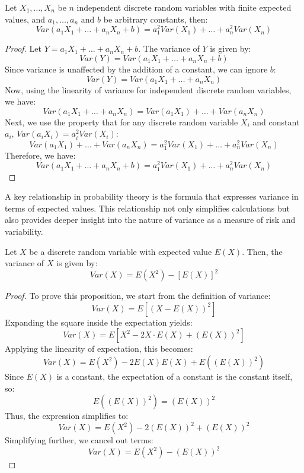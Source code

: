 \begin{proposition}
Let \(X_{1}, \ldots, X_{n}\) be $n$ independent discrete random variables with finite expected values, and \(a_{1},\ldots,a_{n}\) and \(b\) be arbitrary constants, then:
\[
Var\left(a_{1}X_{1}+\ldots+a_{n}X_{n}+b\right)=a_{1}^{2}Var\left(X_{1}\right)+\ldots+a_{n}^{2}Var\left(X_{n}\right)
\]
\end{proposition}
\begin{proof}
Let \(Y = a_{1}X_{1} + \ldots + a_{n}X_{n} + b\). The variance of \(Y\) is given by:
\[
Var(Y) = Var(a_{1}X_{1} + \ldots + a_{n}X_{n} + b)
\]
Since variance is unaffected by the addition of a constant, we can ignore \(b\):
\[
Var(Y) = Var(a_{1}X_{1} + \ldots + a_{n}X_{n})
\]
Now, using the linearity of variance for independent discrete random variables, we have:
\[
Var(a_{1}X_{1} + \ldots + a_{n}X_{n}) = Var(a_{1}X_{1}) + \ldots + Var(a_{n}X_{n})
\]
Next, we use the property that for any discrete random variable \(X_i\) and constant \(a_i\), \(Var(a_i X_i) = a_i^2 Var(X_i)\):
\[
Var(a_{1}X_{1}) + \ldots + Var(a_{n}X_{n}) = a_{1}^2 Var(X_{1}) + \ldots + a_{n}^2 Var(X_{n})
\]
Therefore, we have:
\[
Var(a_{1}X_{1} + \ldots + a_{n}X_{n} + b) = a_{1}^{2}Var(X_{1}) + \ldots + a_{n}^{2}Var(X_{n})
\]
\end{proof}

A key relationship in probability theory is the formula that expresses variance in terms of expected values. This relationship not only simplifies calculations but also provides deeper insight into the nature of variance as a measure of risk and variability.

\begin{proposition}
Let $X$ be a discrete random variable with expected value $E(X)$. Then, the variance of $X$ is given by:
\[
Var(X) = E(X^2) - [E(X)]^2
\]
\end{proposition}
\begin{proof}
To prove this proposition, we start from the definition of variance:
\[
Var(X) = E[(X - E(X))^2]
\]
Expanding the square inside the expectation yields:
\[
Var(X) = E[X^2 - 2X \cdot E(X) + (E(X))^2]
\]
Applying the linearity of expectation, this becomes:
\[
Var(X) = E(X^2) - 2E(X)E(X) + E((E(X))^2)
\]
Since \(E(X)\) is a constant, the expectation of a constant is the constant itself, so:
\[
E((E(X))^2) = (E(X))^2
\]
Thus, the expression simplifies to:
\[
Var(X) = E(X^2) - 2(E(X))^2 + (E(X))^2
\]
Simplifying further, we cancel out terms:
\[
Var(X) = E(X^2) - (E(X))^2
\]
\end{proof}

